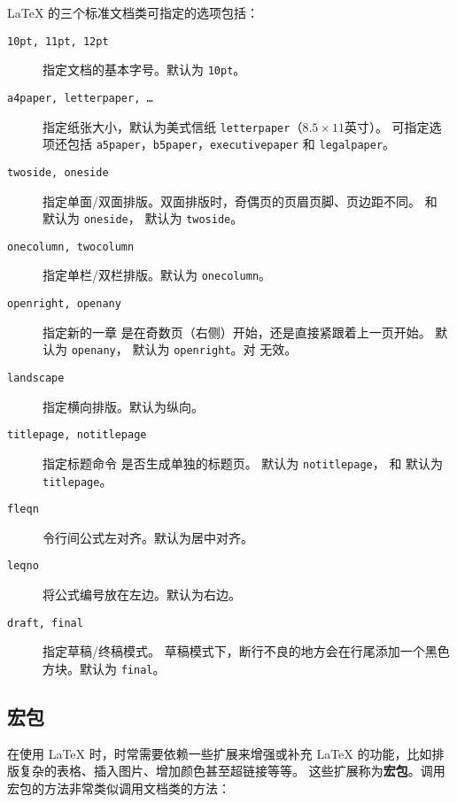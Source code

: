 \LaTeX{} 的三个标准文档类可指定的选项包括：
\begin{description}
\item[\texttt{10pt, 11pt, 12pt}] \quad 指定文档的基本字号。默认为 \texttt{10pt}。
\item[\texttt{a4paper, letterpaper, \ldots}] \quad 指定纸张大小，默认为美式信纸 \texttt{letterpaper}（$8.5\times11$英寸）。
可指定选项还包括 \texttt{a5paper}，\texttt{b5paper}，\texttt{executivepaper} 和 \texttt{legalpaper}。
\item[\texttt{twoside, oneside}] \quad 指定单面/双面排版。双面排版时，奇偶页的页眉页脚、页边距不同。
 和  默认为 \texttt{oneside}， 默认为 \texttt{twoside}。
\item[\texttt{onecolumn, twocolumn}] \quad 指定单栏/双栏排版。默认为 \texttt{onecolumn}。
\item[\texttt{openright, openany}] \quad 指定新的一章  是在奇数页（右侧）开始，还是直接紧跟着上一页开始。
 默认为 \texttt{openany}， 默认为 \texttt{openright}。对  无效。
\item[\texttt{landscape}] \quad 指定横向排版。默认为纵向。
\item[\texttt{titlepage, notitlepage}] 指定标题命令  是否生成单独的标题页。
 默认为 \texttt{notitlepage}， 和  默认为 \texttt{titlepage}。
\item[\texttt{fleqn}] \quad 令行间公式左对齐。默认为居中对齐。
\item[\texttt{leqno}] \quad 将公式编号放在左边。默认为右边。
\item[\texttt{draft, final}] \quad 指定草稿/终稿模式。
草稿模式下，断行不良的地方会在行尾添加一个黑色方块。默认为 \texttt{final}。
\end{description}

\subsection{宏包}\label{subsec:packages}

在使用 \LaTeX{} 时，时常需要依赖一些扩展来增强或补充 \LaTeX{} 的功能，比如排版复杂的表格、插入图片、增加颜色甚至超链接等等。
这些扩展称为\textbf{宏包}。调用宏包的方法非常类似调用文档类的方法：
\begin{command}
\end{command}

